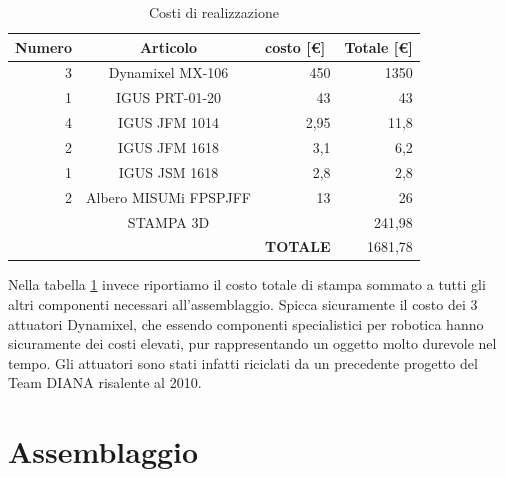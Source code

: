 \documentclass[%
corpo=11pt,
twoside,
 stile=classica,
oldstyle,
greek,%
]{toptesi}
\begin{document}
	\begin{table}[H]
		\centering
		\caption{Costi di realizzazione}
		\begin{tabular}{rrr|r|r|}
			\hline
			\multicolumn{1}{|l|}{\textbf{Numero}} & \multicolumn{2}{c|}{\textbf{Articolo}} & \multicolumn{1}{l|}{\textbf{costo [€]}} & \multicolumn{1}{l|}{\textbf{Totale [€]}} \bigstrut\\
			\hline
			\multicolumn{1}{|r|}{3} & \multicolumn{2}{c|}{Dynamixel MX-106} & 450   & 1350 \bigstrut\\
			\hline
			\multicolumn{1}{|r|}{1} & \multicolumn{2}{c|}{IGUS PRT-01-20} & 43    & 43 \bigstrut\\
			\hline
			\multicolumn{1}{|r|}{4} & \multicolumn{2}{c|}{IGUS JFM 1014} & 2,95  & 11,8 \bigstrut\\
			\hline
			\multicolumn{1}{|r|}{2} & \multicolumn{2}{c|}{IGUS JFM 1618} & 3,1   & 6,2 \bigstrut\\
			\hline
			\multicolumn{1}{|r|}{1} & \multicolumn{2}{c|}{IGUS JSM 1618} & 2,8   & 2,8 \bigstrut\\
			\hline
			\multicolumn{1}{|r|}{2} & \multicolumn{2}{c|}{Albero MISUMi FPSPJFF} & 13    & 26 \bigstrut\\
			\hline
			\multicolumn{1}{|r|}{} & \multicolumn{2}{c|}{STAMPA 3D} &       & 241,98 \bigstrut\\
			\hline
			&       &       & \textbf{TOTALE} & 1681,78 \bigstrut\\
			\cline{4-5}    \end{tabular}%
		\label{tab:projectcost}%
	\end{table}%
	Nella tabella \ref{tab:projectcost} invece riportiamo il costo totale di stampa sommato a tutti gli altri componenti necessari all'assemblaggio. Spicca sicuramente il costo dei 3 attuatori Dynamixel, che essendo componenti specialistici per robotica hanno sicuramente dei costi elevati, pur rappresentando un oggetto molto durevole nel tempo. Gli attuatori sono stati infatti riciclati da un precedente progetto del Team DIANA risalente al 2010. 
	\newpage
	\section{Assemblaggio}
\end{document}
